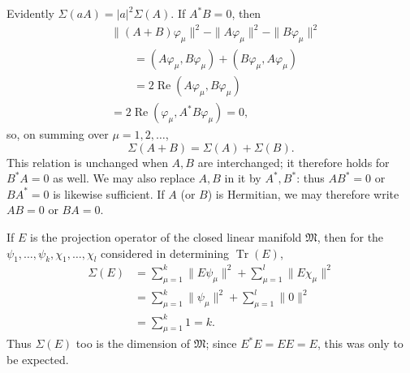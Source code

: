 \documentclass[fontsize=13pt,twoside,openany,headings=normal,parskip=false,bookmarkpackage=false,DIV=calc]{scrbook}
\begin{document}
Evidently $\Sigma(aA)=|a|^2\Sigma(A)$. If $A^*B=0$, then
\begin{align*}
&\|(A+B)\varphi_\mu\|^2-\|A\varphi_\mu\|^2-\|B\varphi_\mu\|^2\\
&\qquad=(A\varphi_\mu,B\varphi_\mu)+(B\varphi_\mu,A\varphi_\mu)\\
&\qquad=2\operatorname{Re}(A\varphi_\mu,B\varphi_\mu)\\
&=2\operatorname{Re}(\varphi_\mu,A^*B\varphi_\mu)=0,
\end{align*}
so, on summing over $\mu=1,2,\ldots$,
\[
\Sigma(A+B)=\Sigma(A)+\Sigma(B).
\]
This relation is unchanged when $A,B$ are interchanged; it therefore holds for $B^*A=0$ as well. We may also replace $A,B$ in it by $A^*,B^*$: thus $AB^*=0$ or $BA^*=0$ is likewise sufficient. If $A$ (or $B$) is Hermitian, we may therefore write $AB=0$ or $BA=0$.

If $E$ is the projection operator of the closed linear manifold $\mathfrak M$, then for the $\psi_1,\ldots,\psi_k,\chi_1,\ldots,\chi_l$ considered in determining $\operatorname{Tr}(E)$,
\hypertarget{origpage-97}{}%
\begin{align*}
\Sigma(E)&=\sum_{\mu=1}^{k}\|E\psi_\mu\|^2
+\sum_{\mu=1}^{l}\|E\chi_\mu\|^2\\
&=\sum_{\mu=1}^{k}\|\psi_\mu\|^2
+\sum_{\mu=1}^{l}\|0\|^2\\
&=\sum_{\mu=1}^{k}1=k.
\end{align*}
Thus $\Sigma(E)$ too is the dimension of $\mathfrak M$; since $E^*E=EE=E$, this was only to be expected.
\end{document}
